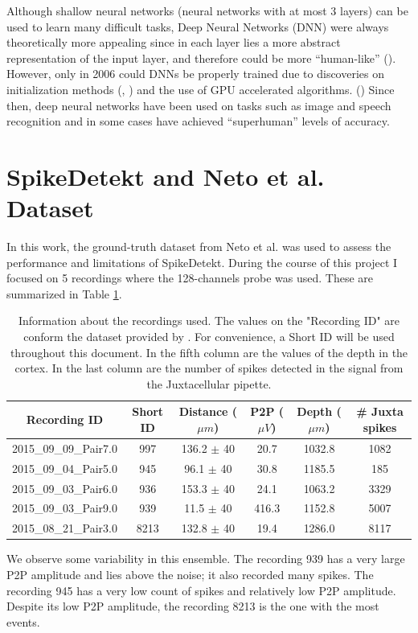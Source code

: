 \documentclass[10pt]{article}
\begin{document}
Although shallow neural networks (neural networks with at most 3 layers) can be used to learn many difficult tasks, Deep Neural Networks (DNN) were always theoretically more appealing since in each layer lies a more abstract representation of the input layer, and therefore could be more “human-like” (\cite{rumelhart1988learning}). However, only in 2006 could DNNs be properly trained due to discoveries on initialization methods (\cite{hinton2006fast}, \cite{bengio2007greedy}) and the use of GPU accelerated algorithms. (\cite{raina2009large}) Since then, deep neural networks have been used on tasks such as image and speech recognition and in some cases have achieved “superhuman” levels of accuracy.

\section{SpikeDetekt and Neto et al. Dataset}
In this work, the ground-truth dataset from Neto et al. was used to assess the performance and limitations of SpikeDetekt. During the course of this project I focused on 5 recordings where the 128-channels probe was used. These are summarized in Table \ref{tab:sum-recordings}.

\begin{table}[!h]
\captionsetup{font=small}
\centering
\begin{tabular}{cccccc}
\textbf{Recording ID} & \textbf{Short ID} & \textbf{Distance ($\mu m$) } & \textbf{P2P ($\mu V$)} & \textbf{Depth ($\mu m$)} & \textbf{\# Juxta spikes}\\ \hline
2015\_09\_09\_Pair7.0 & 997 & 136.2 $\pm$ 40 & 20.7 & 1032.8 & 1082  \\ 
2015\_09\_04\_Pair5.0 & 945 & 96.1 $\pm$ 40 & 30.8 & 1185.5 & 185  \\
2015\_09\_03\_Pair6.0 & 936 & 153.3 $\pm$  40 & 24.1 & 1063.2 & 3329 \\
2015\_09\_03\_Pair9.0 & 939 & 11.5 $\pm$  40 & 416.3 & 1152.8 & 5007  \\
2015\_08\_21\_Pair3.0 & 8213 & 132.8 $\pm$ 40 & 19.4 & 1286.0 & 8117 \\ 
\end{tabular}
\caption{Information about the recordings used. The values on the "Recording ID" are conform the dataset provided by \cite{Netoetal}. For convenience, a Short ID will be used throughout this document. In the fifth column are the values of the depth in the cortex. In the last column are the number of spikes detected in the signal from the Juxtacellular pipette.}
\label{tab:sum-recordings}
\end{table}
We observe some variability in this ensemble. 
The recording 939 has a very large P2P amplitude and lies above the noise; it also recorded many spikes. 
The recording 945 has a very low count of spikes and relatively low P2P amplitude. Despite its low P2P amplitude, the recording 8213 is the one with the most events.
\end{document}
